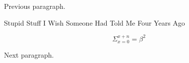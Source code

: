 \documentclass{book}
\begin{document}
Previous paragraph.

\centerline{\sc Stupid Stuff I Wish Someone Had Told Me Four Years Ago}

\begin{equation}
\Sigma_{x=0}^{x+n} = \beta^2
\end{equation}

Next paragraph.
\end{document}

